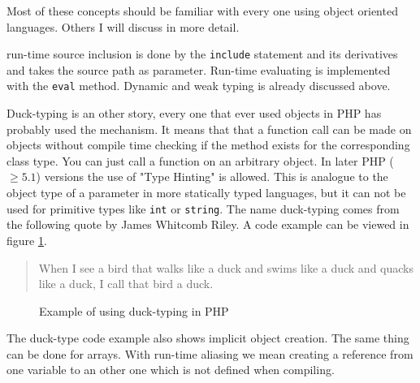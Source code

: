 \documentclass[a4paper,10pt,twocolumn]{article}
\begin{document}
Most of these concepts should be familiar with every one using object oriented languages. Others I will discuss in more detail.

run-time source inclusion is done by the \verb|include| statement and its derivatives and takes the source path as parameter. Run-time evaluating is implemented with the \verb|eval| method. Dynamic and weak typing is already discussed above. 

Duck-typing is an other story, every one that ever used objects in PHP has probably used the mechanism. It means that that a function call can be made on objects without compile time checking if the method exists for the corresponding class type. You can just call a function on an arbitrary object. In later PHP ($\geq 5.1$) versions the use of "Type Hinting" is allowed. This is analogue to the object type of a parameter in more statically typed languages, but it can not be used for primitive types like \verb|int| or \verb|string|. The name duck-typing comes from the following quote by James Whitcomb Riley. A code example can be viewed in figure \ref{fig:duck}.

\begin{quote}
When I see a bird that walks like a duck and swims like a duck and quacks like a duck, I call that bird a duck.
\end{quote}


\begin{figure}
\label{fig:duck} 
\caption{Example of using duck-typing in PHP}
\end{figure}

The duck-type code example also shows implicit object creation. The same thing can be done for arrays. With run-time aliasing we mean creating a reference from one variable to an other one which is not defined when compiling.
\end{document}
